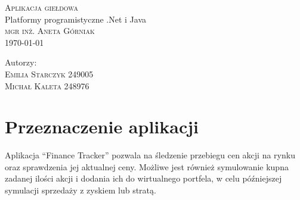\documentclass{article}
\begin{document}
\begin{titlepage}
   \vspace*{80mm}
   \centering
   \noindent\makebox[\linewidth]{\rule{\paperwidth}{0.4pt}}
   \LARGE{\textsc{Aplikacja giełdowa}\\}
   Platformy programistyczne .Net i Java\\
   \textsc{\large mgr inż. Aneta Górniak\\}
   \large \today \\
   \noindent\makebox[\linewidth]{\rule{\paperwidth}{0.4pt}}
   \begin{minipage}[l]{0.3\textwidth}
      \vspace{0.4cm}
      Autorzy:\\
      \textsc{\large Emilia Starczyk} 249005\\
      \textsc{\large Michał Kaleta} 248976\\
   \end{minipage}

   \vfill
\end{titlepage}
\section{Przeznaczenie aplikacji}
Aplikacja ``Finance Tracker'' pozwala na śledzenie przebiegu cen akcji na rynku
oraz sprawdzenia jej aktualnej ceny. Możliwe jest również symulowanie kupna
zadanej ilości akcji i dodania ich do wirtualnego portfela, w celu późniejszej
symulacji sprzedaży z zyskiem lub stratą.
\end{document}
